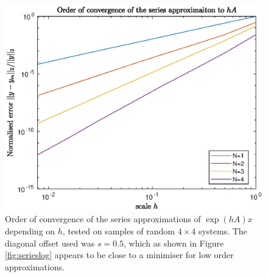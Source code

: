 
\begin{figure}
    \centering
    \includegraphics[width=0.75\linewidth]{Matlab/seriesworse.eps}
    \caption{
        Order of convergence of the series approximations of $\exp(hA)x$ depending on $h$, tested on samples of random $4 \times 4$ systems.
        The diagonal offset used was $s = 0.5$, which as shown in Figure \ref{fig:serieslog} appears to be close to a minimiser for low order approximations.
    }
    \label{fig:seriesorder}
\end{figure}


